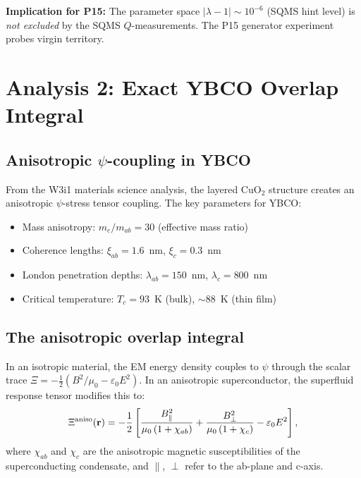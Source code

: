 \documentclass[11pt]{article}
\newcommand{\lam}{\lambda}
\begin{document}
\textbf{Implication for P15:} The parameter space $|\lam-1| \sim 10^{-6}$
(SQMS hint level) is \emph{not excluded} by the SQMS $Q$-measurements.
The P15 generator experiment probes virgin territory.

\section{Analysis 2: Exact YBCO Overlap Integral}
\label{sec:ybco-exact}

\subsection{Anisotropic $\psi$-coupling in YBCO}

From the W3i1 materials science analysis, the layered CuO$_2$ structure
creates an anisotropic $\psi$-stress tensor coupling. The key parameters
for YBCO:
\begin{itemize}[nosep]
\item Mass anisotropy: $m_c/m_{ab} = 30$ (effective mass ratio)
\item Coherence lengths: $\xi_{ab} = 1.6$~nm, $\xi_c = 0.3$~nm
\item London penetration depths: $\lambda_{ab} = 150$~nm,
$\lambda_c = 800$~nm
\item Critical temperature: $T_c = 93$~K (bulk), $\sim 88$~K (thin film)
\end{itemize}

\subsection{The anisotropic overlap integral}

In an isotropic material, the EM energy density couples to
$\psi$ through the scalar trace $\Xi = -\frac{1}{2}(B^2/\mu_0
- \varepsilon_0 E^2)$. In an anisotropic superconductor, the
superfluid response tensor modifies this to:
\begin{equation}
\Xi^{\rm aniso}(\mathbf{r}) = -\frac{1}{2}\left[
\frac{B_\parallel^2}{\mu_0\,(1+\chi_{ab})}
+ \frac{B_\perp^2}{\mu_0\,(1+\chi_c)}
- \varepsilon_0 E^2\right],
\end{equation}
where $\chi_{ab}$ and $\chi_c$ are the anisotropic magnetic
susceptibilities of the superconducting condensate, and
$\parallel$, $\perp$ refer to the ab-plane and c-axis.
\end{document}
